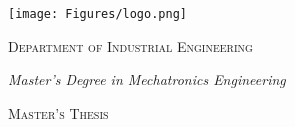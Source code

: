 \begin{comment}
    \end{flushright}
    \end{minipage}\\
    \vspace{2cm}
    {\large Company supervisor\\ Witted Srl:}\\
    \textbf{PhD Emanuele Rocco}
    \vspace*{\stretch{1}}
    \vfill
    \vspace{0.3cm}
    \noindent\hrulefill
    \vspace{0.3cm}
    \Large
    
    Academic Year {2020-2021}
\end{center}
\end{comment}
\begin{titlepage}
	\begin{center}
		\texttt{[image: Figures/logo.png]}
		
		\noindent\hrulefill
		\vspace{0.5cm}
		
		{\Large \textsc{Department of Industrial Engineering}}
		\vspace{0.3cm}
		
		{\large \emph{Master's Degree in Mechatronics Engineering}}
		\vspace{1cm}
		
		{\large \textsc{Master's Thesis}}
		\vspace{2cm}\\
		
		
		
		
		
	

\end{center}
\end{titlepage}

